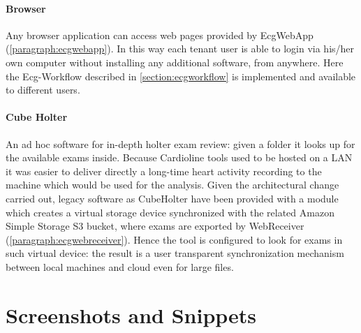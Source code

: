 \paragraph{Browser}
Any browser application can access web pages provided by EcgWebApp (\ref{paragraph:ecgwebapp}). In this way each tenant user is able to login via his/her own computer without installing any additional software, from anywhere.
Here the Ecg-Workflow described in \ref{section:ecgworkflow} is implemented and available to different users.\\
\paragraph{Cube Holter}
An ad hoc software for in-depth holter exam review: given a folder it looks up for the available exams inside.
Because Cardioline tools used to be hosted on a LAN it was easier to deliver directly a long-time heart activity recording to the machine which would be used for the analysis. Given the architectural change carried out, legacy software as CubeHolter have been provided with a module which creates a virtual storage device synchronized with the related Amazon Simple Storage S3 bucket, where exams are exported by WebReceiver (\ref{paragraph:ecgwebreceiver}). Hence the tool is configured to look for exams in such virtual device: the result is a user transparent synchronization mechanism between local machines and cloud even for large files.

\section{Screenshots and Snippets}

